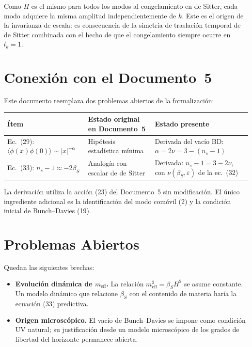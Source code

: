 \documentclass[12pt,a4paper]{article}
\begin{document}
Como $H$ es el mismo para todos los modos al congelamiento en de Sitter, cada modo adquiere la misma amplitud independientemente de $k$. Este es el origen de la invarianza de escala: es consecuencia de la simetría de traslación temporal de de Sitter combinada con el hecho de que el congelamiento siempre ocurre en $l_k = 1$.

\section{Conexión con el Documento~5}

Este documento reemplaza dos problemas abiertos de la formalización:

\begin{table}[h]
\centering
\small
\begin{tabular}{lp{4cm}p{6.5cm}}
\toprule
Ítem & Estado original en Documento~5 & Estado presente \\
\midrule
Ec.~(29): $\langle\phi(x)\phi(0)\rangle \sim |x|^{-\alpha}$ & Hipótesis estadística mínima & Derivada del vacío BD: $\alpha = 2\nu = 3 - (n_s - 1)$ \\[4pt]
Ec.~(33): $n_s - 1 \approx -2\beta_S$ & Analogía con escalar de de Sitter & Derivada: $n_s - 1 = 3 - 2\nu$, con $\nu(\beta_S, \varepsilon)$ de la ec.~(32) \\
\bottomrule
\end{tabular}
\end{table}

La derivación utiliza la acción (23) del Documento~5 sin modificación. El único ingrediente adicional es la identificación del modo comóvil (2) y la condición inicial de Bunch--Davies (19).

\section{Problemas Abiertos}

Quedan las siguientes brechas:

\begin{itemize}
  \item \textbf{Evolución dinámica de $m_\text{eff}$.} La relación $m_\text{eff}^2 = \beta_S H^2$ se asume constante. Un modelo dinámico que relacione $\beta_S$ con el contenido de materia haría la ecuación (33) predictiva.
  \item \textbf{Origen microscópico.} El vacío de Bunch--Davies se impone como condición UV natural; su justificación desde un modelo microscópico de los grados de libertad del horizonte permanece abierta.
\end{itemize}
\end{document}
